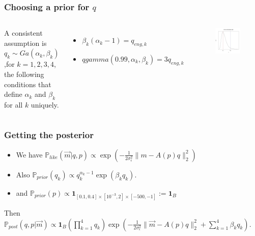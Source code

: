 \documentclass[11pt]{beamer}
\theoremstyle{plain}
\theoremstyle{definition}
\newcommand{\p}{\mathbb{P}}
\newcommand{\like}{\p_{like}}
\newcommand{\prior}{\p_{prior}}
\newcommand{\post}{\p_{post}}
\begin{document}
\begin{frame}
\frametitle{Choosing a prior for $q$}
\begin{columns}[c]
\column{2.2in}
A consistent assumption is $q_{k}\sim Ga(\alpha_{k},\beta_{k})$,for $k=1,2,3,4$,
the following conditions that define $\alpha_{k}$ and $\beta_{k}$ for all $k$ uniquely.

\begin{itemize}
\item $\beta_{k}(\alpha_{k}-1)=q_{eng,k}$
\item $qgamma(0.99,\alpha_{k},\beta_{k})=3q_{eng,k}$
\end{itemize}
\column{1.5in}
\begin{figure}
\includegraphics[scale=0.3]{gamma_generic}
\end{figure}
\end{columns}
\end{frame}


\begin{frame}
\frametitle{Getting the posterior}
\begin{itemize}
\item We have $\like(\vec{m}|q,p)\propto
\exp(-\frac{1}{2\sigma_{\epsilon}^{2}}\|m-A(p)q\|^{2}_{2})$
\item Also $\prior(q_{k})\propto q_{k}^{\alpha_{k}-1}\exp(\beta_{k}q_{k})$.
\item and $\prior(p)\propto\textbf{1}_{[0.1,0.4]\times[10^{-3},2]\times[-500,-1]}
:=\textbf{1}_{B}$
\end{itemize}
\bigskip
Then
\newline 
\newline
$\post(q,p|\vec{m})\propto
\textbf{1}_{B}\left(\prod_{k=1}^{4}q_{k}\right)\exp(-\frac{1}{2\sigma_{\epsilon}^{2}}\|\vec{m}-A(p)q\|^{2}_{2}+
\sum_{k=1}^{4}\beta_{k}q_{k})$.
\end{frame}
\end{document}
